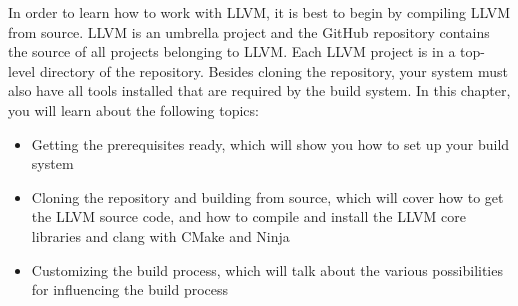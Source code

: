 In order to learn how to work with LLVM, it is best to begin by compiling LLVM from source. LLVM is an umbrella project and the GitHub repository contains the source of all projects belonging to LLVM. Each LLVM project is in a top-level directory of the repository. Besides cloning the repository, your system must also have all tools installed that are required by the build system. In this chapter, you will learn about the following topics:

\begin{itemize}
\item 
Getting the prerequisites ready, which will show you how to set up your build system

\item 
Cloning the repository and building from source, which will cover how to get the LLVM source code, and how to compile and install the LLVM core libraries and clang with CMake and Ninja

\item 
Customizing the build process, which will talk about the various possibilities for influencing the build process
\end{itemize}








